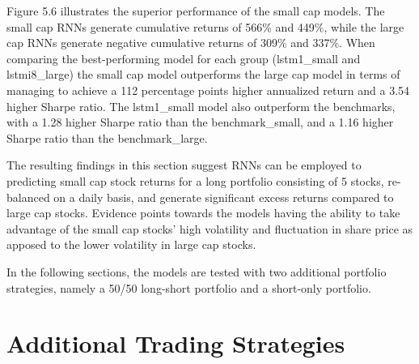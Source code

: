 \indent\newline 
Figure 5.6 illustrates the superior performance of the small cap models. The small cap RNNs generate cumulative returns of 566\% and 449\%, while the large cap RNNs generate negative cumulative returns of 309\% and 337\%. When comparing the best-performing model for each group (lstm1\_small and lstmi8\_large) the small cap model outperforms the large cap model in terms of managing to achieve a 112 percentage points higher annualized return and a 3.54 higher Sharpe ratio. The lstm1\_small model also outperform the benchmarks, with a 1.28 higher Sharpe ratio than the benchmark\_small, and a 1.16 higher Sharpe ratio than the benchmark\_large. 

\indent\newline 
The resulting findings in this section suggest RNNs can be employed to predicting small cap stock returns for a long portfolio consisting of 5 stocks, re-balanced on a daily basis, and generate significant excess returns compared to large cap stocks. Evidence points towards the models having the ability to take advantage of the small cap stocks'  high volatility and fluctuation in share price as apposed to the lower volatility in large cap stocks.    

\indent\newline 
In the following sections, the models are tested with two additional portfolio strategies, namely a 50/50 long-short portfolio and a short-only portfolio.

\section{Additional Trading Strategies}
